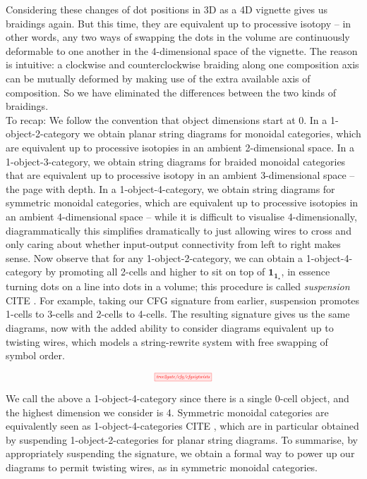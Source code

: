 Considering these changes of dot positions in 3D as a 4D vignette gives us braidings again. But this time, they are equivalent up to processive isotopy -- in other words, any two ways of swapping the dots in the volume are continuously deformable to one another in the 4-dimensional space of the vignette. The reason is intuitive: a clockwise and counterclockwise braiding along one composition axis can be mutually deformed by making use of the extra available axis of composition. So we have eliminated the differences between the two kinds of braidings.\\

To recap: We follow the convention that object dimensions start at 0. In a 1-object-2-category we obtain planar string diagrams for monoidal categories, which are equivalent up to processive isotopies in an ambient 2-dimensional space. In a 1-object-3-category, we obtain string diagrams for braided monoidal categories that are equivalent up to processive isotopy in an ambient 3-dimensional space -- the page with depth. In a 1-object-4-category, we obtain string diagrams for symmetric monoidal categories, which are equivalent up to processive isotopies in an ambient 4-dimensional space -- while it is difficult to visualise 4-dimensionally, diagrammatically this simplifies dramatically to just allowing wires to cross and only caring about whether input-output connectivity from left to right makes sense. Now observe that for any 1-object-2-category, we can obtain a 1-object-4-category by promoting all 2-cells and higher to sit on top of $\textbf{1}_{\textbf{1}_\star}$, in essence turning dots on a line into dots in a volume; this procedure is called \emph{suspension} \bR CITE \e. For example, taking our CFG signature from earlier, suspension promotes 1-cells to 3-cells and 2-cells to 4-cells. The resulting signature gives us the same diagrams, now with the added ability to consider diagrams equivalent up to twisting wires, which models a string-rewrite system with free swapping of symbol order.

\[\scalebox{0.5}{\tikzfig{tree2gate/cfg/cfgsigtwists}}\]

We call the above a 1-object-4-category since there is a single 0-cell object, and the highest dimension we consider is 4. Symmetric monoidal categories are equivalently seen as 1-object-4-categories \bR CITE \e, which are in particular obtained by suspending 1-object-2-categories for planar string diagrams. To summarise, by appropriately suspending the signature, we obtain a formal way to power up our diagrams to permit twisting wires, as in symmetric monoidal categories.\\

